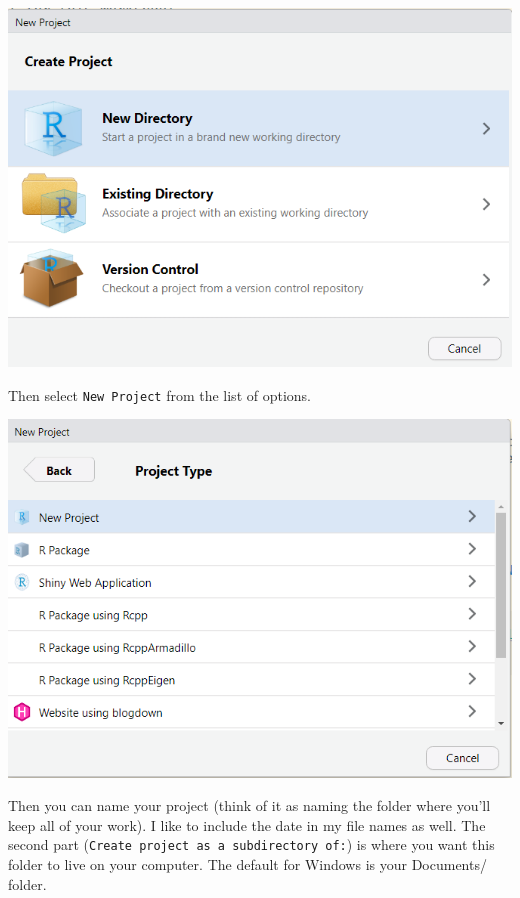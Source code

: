 \documentclass[]{book}
\begin{document}
\includegraphics[width=9.26in]{images/03-03-newproject}

Then select \texttt{New\ Project} from the list of options.

\includegraphics[width=9.28in]{images/03-01-newproject}

Then you can name your project (think of it as naming the folder where
you'll keep all of your work). I like to include the date in my file
names as well. The second part
(\texttt{Create\ project\ as\ a\ subdirectory\ of:}) is where you want
this folder to live on your computer. The default for Windows is your
Documents/ folder.
\end{document}
